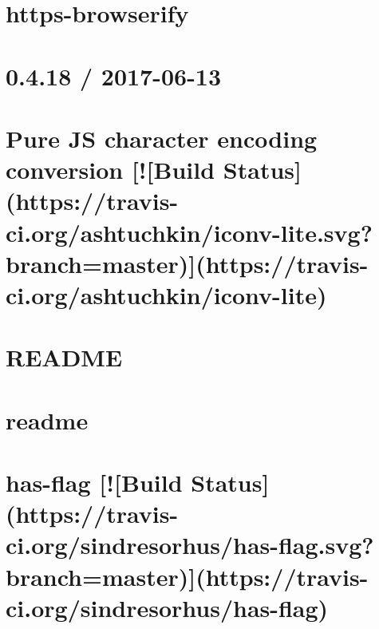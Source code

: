 \documentclass[twoside]{book}
\newcommand{\+}{\discretionary{\mbox{\scriptsize$\hookleftarrow$}}{}{}}
\begin{document}
\chapter{https-\/browserify}
\label{md__c_1_workspace_demo_src_main_script_node_modules_https-browserify_readme}

\chapter{0.4.18 / 2017-\/06-\/13}
\label{md__c_1_workspace_demo_src_main_script_node_modules_iconv-lite__changelog}

\chapter{Pure JS character encoding conversion \mbox{[}!\mbox{[}Build Status\mbox{]}(https\+://travis-\/ci.org/ashtuchkin/iconv-\/lite.svg?branch=master)\mbox{]}(https\+://travis-\/ci.org/ashtuchkin/iconv-\/lite)}
\label{md__c_1_workspace_demo_src_main_script_node_modules_iconv-lite__r_e_a_d_m_e}

\chapter{R\+E\+A\+D\+ME}
\label{md__c_1_workspace_demo_src_main_script_node_modules_icss-replace-symbols__r_e_a_d_m_e}

\chapter{readme}
\label{md__c_1_workspace_demo_src_main_script_node_modules_icss-utils_node_modules_chalk_readme}

\chapter{has-\/flag \mbox{[}!\mbox{[}Build Status\mbox{]}(https\+://travis-\/ci.org/sindresorhus/has-\/flag.svg?branch=master)\mbox{]}(https\+://travis-\/ci.org/sindresorhus/has-\/flag)}
\label{md__c_1_workspace_demo_src_main_script_node_modules_icss-utils_node_modules_has-flag_readme}

\end{document}
